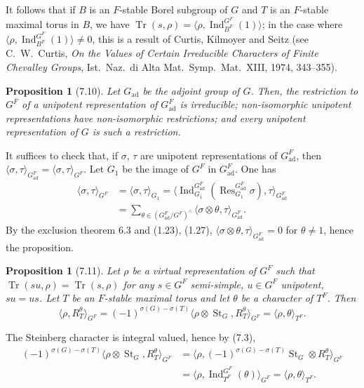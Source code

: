 \documentclass[11pt]{amsart}
\theoremstyle{plain}
\newtheorem{proposition}[theorem]{Proposition}
\theoremstyle{remark}
\DeclareMathOperator{\Ind}{Ind}
\DeclareMathOperator{\Tr}{Tr}
\DeclareMathOperator{\ad}{ad}
\DeclareMathOperator{\St}{St}
\DeclareMathOperator{\Res}{Res}
\begin{document}
It follows that if $B$ is an $F$-stable Borel subgroup of $G$ and $T$ is an $F$-stable maximal torus in $B$, we have $\Tr(s, \rho) = \langle \rho, \Ind_{B^F}^{G^F}(1) \rangle$; in the case where $\langle \rho, \Ind_{B^F}^{G^F}(1) \rangle \neq 0$, this is a result of Curtis, Kilmoyer and Seitz (see C.\ W.\ Curtis, \textit{On the Values of Certain Irreducible Characters of Finite Chevalley Groups}, Ist.\ Naz.\ di Alta Mat.\ Symp.\ Mat.\ XIII, 1974, 343--355).

\begin{proposition}[7.10]
Let $G_{\ad}$ be the adjoint group of $G$. Then, the restriction to $G^F$ of a unipotent representation of $G_{\ad}^F$ is irreducible; non-isomorphic unipotent representations have non-isomorphic restrictions; and every unipotent representation of $G$ is such a restriction.
\end{proposition}

It suffices to check that, if $\sigma$, $\tau$ are unipotent representations of $G_{\ad}^F$, then $\langle \sigma, \tau \rangle_{G_{\ad}^F} = \langle \sigma, \tau \rangle_{G^F}$. Let $G_1$ be the image of $G^F$ in $G_{\ad}^F$. One has
\begin{align*}
\langle \sigma, \tau \rangle_{G^F} &= \langle \sigma, \tau \rangle_{G_1} = \langle \Ind_{G_1}^{G_{\ad}^F}(\Res_{G_1}^{G_{\ad}^F} \sigma), \tau \rangle_{G_{\ad}^F} \\
&= \sum_{\theta \in (G_{\ad}^F/G^F)^\wedge} \langle \sigma \otimes \theta, \tau \rangle_{G_{\ad}^F}.
\end{align*}
By the exclusion theorem 6.3 and (1.23), (1.27), $\langle \sigma \otimes \theta, \tau \rangle_{G_{\ad}^F} = 0$ for $\theta \neq 1$, hence the proposition.

\begin{proposition}[7.11]
Let $\rho$ be a virtual representation of $G^F$ such that $\Tr(su, \rho) = \Tr(s, \rho)$ for any $s \in G^F$ semi-simple, $u \in G^F$ unipotent, $su = us$. Let $T$ be an $F$-stable maximal torus and let $\theta$ be a character of $T^F$. Then
\[
\langle \rho, R_T^\theta \rangle_{G^F} = (-1)^{\sigma(G) - \sigma(T)} \langle \rho \otimes \St_G, R_T^\theta \rangle_{G^F} = \langle \rho, \theta \rangle_{T^F}.
\]
\end{proposition}

The Steinberg character is integral valued, hence by (7.3),
\begin{align*}
(-1)^{\sigma(G) - \sigma(T)} \langle \rho \otimes \St_G, R_T^\theta \rangle_{G^F} &= \langle \rho, (-1)^{\sigma(G) - \sigma(T)} \St_G \otimes R_T^\theta \rangle_{G^F} \\
&= \langle \rho, \Ind_{T^F}^{G^F}(\theta) \rangle_{G^F} = \langle \rho, \theta \rangle_{T^F}.
\end{align*}
\end{document}
